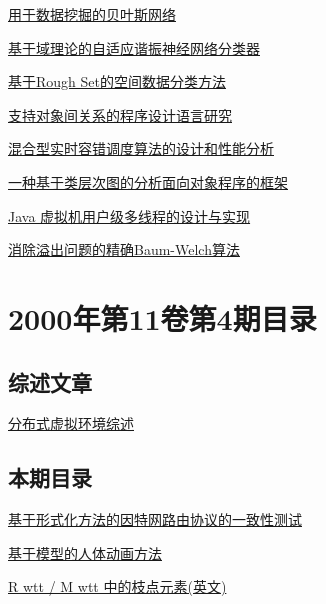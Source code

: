 \documentclass[a4paper]{article}
\begin{document}
\href{http://www.jos.org.cn/ch/reader/download_pdf.aspx?file_no=20000512&year_id=2000&quarter_id=5&falg=1}{用于数据挖掘的贝叶斯网络}

\href{http://www.jos.org.cn/ch/reader/download_pdf.aspx?file_no=20000513&year_id=2000&quarter_id=5&falg=1}{基于域理论的自适应谐振神经网络分类器}

\href{http://www.jos.org.cn/ch/reader/download_pdf.aspx?file_no=20000514&year_id=2000&quarter_id=5&falg=1}{基于Rough Set的空间数据分类方法}

\href{http://www.jos.org.cn/ch/reader/download_pdf.aspx?file_no=20000515&year_id=2000&quarter_id=5&falg=1}{支持对象间关系的程序设计语言研究}

\href{http://www.jos.org.cn/ch/reader/download_pdf.aspx?file_no=20000516&year_id=2000&quarter_id=5&falg=1}{混合型实时容错调度算法的设计和性能分析}

\href{http://www.jos.org.cn/ch/reader/download_pdf.aspx?file_no=20000517&year_id=2000&quarter_id=5&falg=1}{一种基于类层次图的分析面向对象程序的框架}

\href{http://www.jos.org.cn/ch/reader/download_pdf.aspx?file_no=20000518&year_id=2000&quarter_id=5&falg=1}{Java 虚拟机用户级多线程的设计与实现}

\href{http://www.jos.org.cn/ch/reader/download_pdf.aspx?file_no=20000519&year_id=2000&quarter_id=5&falg=1}{消除溢出问题的精确Baum-Welch算法}


\section{\textbf{2000年第11卷第4期目录}}
\subsection{综述文章}
\href{http://www.jos.org.cn/ch/reader/download_pdf.aspx?file_no=20000406&year_id=2000&quarter_id=4&falg=1}{分布式虚拟环境综述}

\subsection{本期目录}
\href{http://www.jos.org.cn/ch/reader/download_pdf.aspx?file_no=20000401&year_id=2000&quarter_id=4&falg=1}{基于形式化方法的因特网路由协议的一致性测试}

\href{http://www.jos.org.cn/ch/reader/download_pdf.aspx?file_no=20000402&year_id=2000&quarter_id=4&falg=1}{基于模型的人体动画方法}

\href{http://www.jos.org.cn/ch/reader/download_pdf.aspx?file_no=20000403&year_id=2000&quarter_id=4&falg=1}{R wtt / M wtt 中的枝点元素(英文)}
\end{document}
